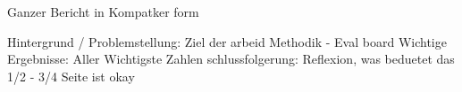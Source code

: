 

\begin{abstract}


\end{abstract}


\renewcommand{\extraabstractname}{Abstract} %
\begin{extraAbstract}





Ganzer Bericht in Kompatker form

Hintergrund / Problemstellung:
Ziel der arbeid
Methodik - Eval board
Wichtige Ergebnisse: Aller Wichtigste Zahlen
schlussfolgerung: Reflexion, was beduetet das
1/2 - 3/4 Seite ist okay

\end{extraAbstract}



